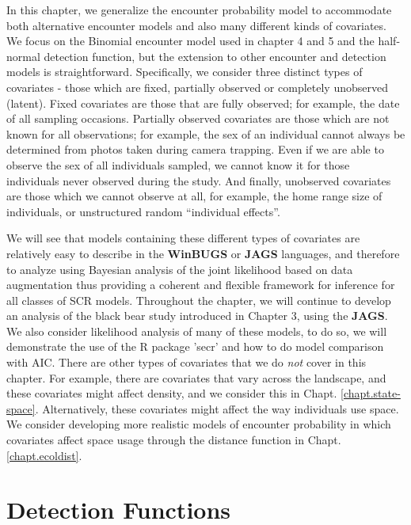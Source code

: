 In this chapter, we  generalize the encounter probability
model to accommodate both alternative encounter models and also 
many different kinds of covariates. We focus on the Binomial encounter
model used in chapter 4 and 5 and the half-normal detection function,
but the extension to other encounter and detection models is
straightforward.  Specifically, we consider three distinct types of
covariates - those which are fixed, partially observed or completely
unobserved (latent).  Fixed covariates are those that are fully
observed; for example, the date of all sampling occasions.  Partially
observed covariates are those which are not known for all
observations; for example, the sex of an individual cannot always be
determined from photos taken during camera trapping.  Even if we are
able to observe the sex of all individuals sampled, we cannot know it
for those individuals never observed during the study.  And finally,
unobserved covariates are those which we cannot observe at all, for
example, the home range size of individuals, or unstructured random
``individual effects''.


We will see that models containing these different types of
covariates are relatively easy to describe in the {\bf WinBUGS} or
{\bf JAGS} languages, and
therefore to analyze using Bayesian analysis of the joint likelihood
based on data augmentation thus providing a coherent and flexible
framework for inference for all classes of SCR models.  Throughout the
chapter, we will continue to develop an analysis of the black bear
study introduced in Chapter 3, using the
{\bf JAGS}.  We also
consider likelihood analysis of many of these models, to do so, we
will demonstrate the use of the R package 'secr' and how to do model
comparison with AIC.
There are other types of covariates that we do {\it not} cover in this
chapter. For example, there are covariates that vary across the 
landscape, and these covariates 
might affect density, and we consider this in
Chapt. \ref{chapt.state-space}.
Alternatively, these covariates might affect the way individuals use
space. We consider developing more realistic models of encounter
probability in which covariates affect space usage through  the distance
function in Chapt. \ref{chapt.ecoldist}.


\section{Detection Functions}


